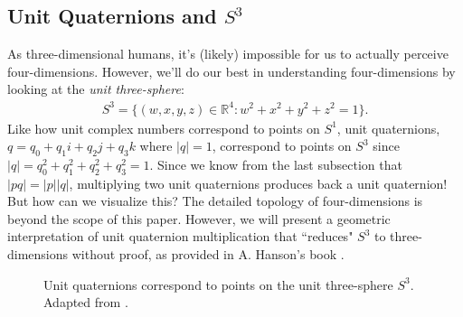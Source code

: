 \documentclass[12pt]{article}
\theoremstyle{plain}
\theoremstyle{definition}
\begin{document}
\subsection{Unit Quaternions and $S^3$}
\label{quatModel}
As three-dimensional humans, it's (likely) impossible for us to actually perceive four-dimensions. However, we'll do our best in understanding four-dimensions by looking at the \textit{unit three-sphere}:
\begin{align*}
    S^3 = \{(w,x,y,z) \in \mathbb{R}^4 : w^2+x^2+y^2+z^2=1\}.
\end{align*}
Like how unit complex numbers correspond to points on $S^1$, unit quaternions, $q=q_0+q_1i+q_2j+q_3k$ where $|q|=1$, correspond to points on $S^3$ since $|q|=q_0^2+q_1^2+q_2^2+q_3^2=1$. Since we know from the last subsection that $|pq|=|p||q|$, multiplying two unit quaternions produces back a unit quaternion! But how can we visualize this? The detailed topology of four-dimensions is beyond the scope of this paper. However, we will present a geometric interpretation of unit quaternion multiplication that ``reduces" $S^3$ to three-dimensions without proof, as provided in A. Hanson's book \cite{hanson}.

\begin{figure}[h]
    \centering
    \caption{Unit quaternions correspond to points on the unit three-sphere $S^3$. Adapted from \cite{hanson}.}
    \label{fig:quatUnitHypers}
\end{figure}
\end{document}
